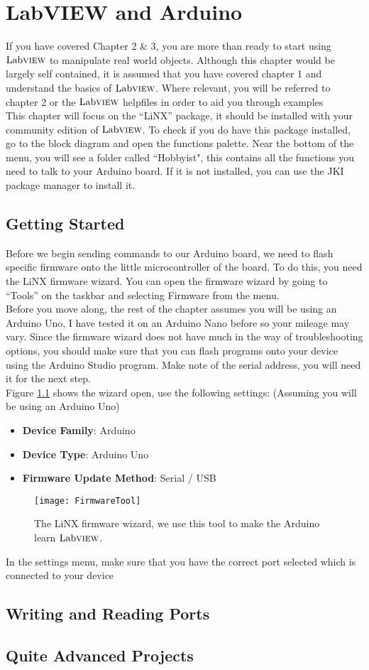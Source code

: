 \chapter{LabVIEW and Arduino}
If you have covered Chapter 2 \& 3, you are more than ready to start using $\text{Lab}\textsc{view}$ to manipulate real world objects. Although this chapter would be largely self contained, it is assumed that you have covered chapter 1 and understand the basics of $\text{Lab}\textsc{view}$. Where relevant, you will be referred to chapter 2 or the $\text{Lab}\textsc{view}$ helpfiles in order to aid you through examples\\

This chapter will focus on the ``LiNX'' package, it should be installed with your community edition of $\text{Lab}\textsc{view}$. To check if you do have this package installed, go to the block diagram and open the functions palette. Near the bottom of the menu, you will see a folder called ``Hobbyist", this contains all the functions you need to talk to your Arduino board. If it is not installed, you can use the JKI package manager to install it.
\section{Getting Started}
Before we begin sending commands to our Arduino board, we need to flash specific firmware onto the little microcontroller of the board. To do this, you need the LiNX firmware wizard. You can open the firmware wizard by going to ``Tools'' on the taskbar and selecting Firmware from the menu.\\ %

Before you move along, the rest of the chapter assumes you will be using an Arduino Uno, I have tested it on an Arduino Nano before so your mileage may vary. Since the firmware wizard does not have much in the way of troubleshooting options, you should make sure that you can flash programs onto your device using the Arduino Studio program. Make note of the serial address, you will need it for the next step.\\

Figure \ref{FirmwareTool} shows the wizard open, use the following settings: (Assuming you will be using an Arduino Uno)
\begin{itemize}
	\item \textbf{Device Family}: Arduino
	\item \textbf{Device Type}: Arduino Uno
	\item \textbf{Firmware Update Method}: Serial / USB
\end{itemize}
\begin{figure}
	\centering
	\texttt{[image: FirmwareTool]}
	\caption{The LiNX firmware wizard, we use this tool to make the Arduino learn $\text{Lab}\textsc{view}$.}
	\label{FirmwareTool}
\end{figure}
In the settings menu, make sure that you have the correct port selected which is connected to your device %
\section{Writing and Reading Ports}

\section{Quite Advanced Projects}